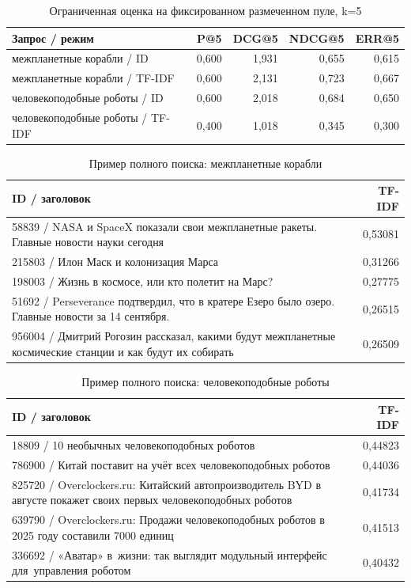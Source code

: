 \documentclass[12pt,a4paper]{article}
\begin{document}
\begin{table}[H]\centering\small
\caption{Ограниченная оценка на фиксированном размеченном пуле, k=5}
\begin{tabularx}{\linewidth}{|X|r|r|r|r|}\hline
Запрос / режим & P@5 & DCG@5 & NDCG@5 & ERR@5 \\\hline
межпланетные корабли / ID & 0,600 & 1,931 & 0,655 & 0,615 \\\hline
межпланетные корабли / TF-IDF & 0,600 & 2,131 & 0,723 & 0,667 \\\hline
человекоподобные роботы / ID & 0,600 & 2,018 & 0,684 & 0,650 \\\hline
человекоподобные роботы / TF-IDF & 0,400 & 1,018 & 0,345 & 0,300 \\\hline
\end{tabularx}\end{table}

\begin{table}[H]\centering\small
\caption{Пример полного поиска: межпланетные корабли}
\begin{tabularx}{\linewidth}{|X|r|}\hline
ID / заголовок & TF-IDF \\\hline
58839 / NASA и SpaceX показали свои межпланетные ракеты. Главные новости науки сегодня & 0,53081 \\\hline
215803 / Илон Маск и колонизация Марса & 0,31266 \\\hline
198003 / Жизнь в космосе, или кто полетит на Марс? & 0,27775 \\\hline
51692 / Perseverance подтвердил, что в кратере Езеро было озеро. Главные новости за 14 сентября. & 0,26515 \\\hline
956004 / Дмитрий Рогозин рассказал, какими будут межпланетные космические станции и как будут их собирать & 0,26509 \\\hline
\end{tabularx}\end{table}

\begin{table}[H]\centering\small
\caption{Пример полного поиска: человекоподобные роботы}
\begin{tabularx}{\linewidth}{|X|r|}\hline
ID / заголовок & TF-IDF \\\hline
18809 / 10 необычных человекоподобных роботов & 0,44823 \\\hline
786900 / Китай поставит на учёт всех человекоподобных роботов & 0,44036 \\\hline
825720 / Overclockers.ru: Китайский автопроизводитель BYD в августе покажет своих первых человекоподобных роботов & 0,41734 \\\hline
639790 / Overclockers.ru: Продажи человекоподобных роботов в 2025 году составили 7000 единиц & 0,41513 \\\hline
336692 / «Аватар» в жизни: так выглядит модульный интерфейс для управления роботом & 0,40432 \\\hline
\end{tabularx}\end{table}
\end{document}
